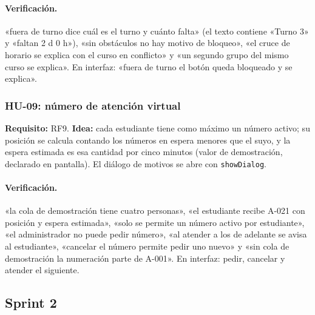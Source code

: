 
\paragraph{Verificación.} «fuera de turno dice cuál es el turno y cuánto falta» (el texto contiene «Turno 3» y «faltan 2 d 0 h»), «sin obstáculos no hay motivo de bloqueo», «el cruce de horario se explica con el curso en conflicto» y «un segundo grupo del mismo curso se explica». En interfaz: «fuera de turno el botón queda bloqueado y se explica».

\subsubsection{HU-09: número de atención virtual}
\textbf{Requisito:} RF9. \textbf{Idea:} cada estudiante tiene como máximo un número activo; su posición se calcula contando los números en espera menores que el suyo, y la espera estimada es esa cantidad por cinco minutos (valor de demostración, declarado en pantalla). El diálogo de motivos se abre con \texttt{showDialog}.




\paragraph{Verificación.} «la cola de demostración tiene cuatro personas», «el estudiante recibe A-021 con posición y espera estimada», «solo se permite un número activo por estudiante», «el administrador no puede pedir número», «al atender a los de adelante se avisa al estudiante», «cancelar el número permite pedir uno nuevo» y «sin cola de demostración la numeración parte de A-001». En interfaz: pedir, cancelar y atender el siguiente.

\subsection{Sprint 2}

